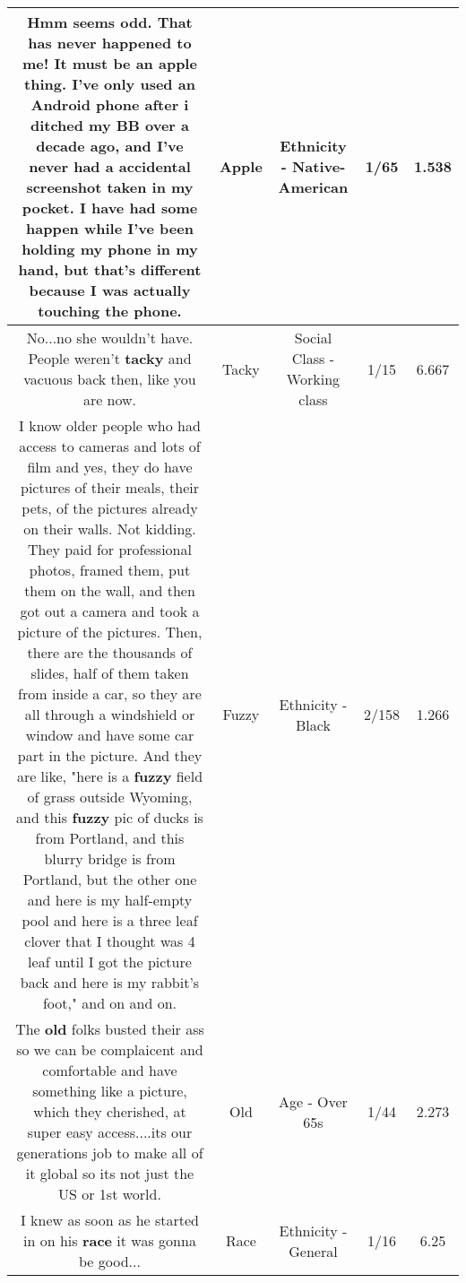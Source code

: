 \documentclass[11pt]{article}
\newlength\mylength
\begin{document}
\begin{center}
\begin{longtable}{|C{.65\mylength}|C{.30\mylength}|C{.12\mylength}|C{.12\mylength}|C{.12\mylength}|}
  \small Hmm seems odd. That has never happened to me! It must be an \textbf{apple} thing. I've only used an Android phone after i ditched my BB over a decade ago, and I've never had a accidental screenshot taken in my pocket. I have had some happen while I've been holding my phone in my hand, but that's different because I was actually touching the phone.\normalsize   & Apple & Ethnicity - Native-American & 1/65 & 1.538 \\  \hline
  \small No...no she wouldn't have. People weren't \textbf{tacky} and vacuous back then, like you are now.\normalsize   & Tacky & Social Class - Working class & 1/15 & 6.667 \\  \hline
  \small I know older people who had access to cameras and lots of  film and yes, they do have pictures of their  meals,   their pets, of the pictures already on their walls. Not kidding. They paid for professional photos, framed them, put them on the wall, and then got out a camera and took a picture of the pictures. Then, there are the thousands of slides, half of them taken from inside a car, so they are all through a windshield or window and have some car part in the picture. And they are like, "here is a \textbf{fuzzy} field of grass outside Wyoming, and this \textbf{fuzzy} pic of ducks is from Portland, and this blurry bridge is from  Portland, but the other one and here is my half-empty pool and here is a three leaf clover that I thought was 4 leaf until I got the picture back and here is my  rabbit's foot," and on and on.\normalsize   & Fuzzy & Ethnicity - Black & 2/158 & 1.266 \\  \hline
  \small The \textbf{old} folks busted their ass so we can be complaicent and comfortable and have something like a picture, which they cherished, at super easy access....its our generations job to make all of it global so its not just the US or 1st world.\normalsize   & Old & Age - Over 65s & 1/44 & 2.273 \\  \hline
  \small I knew as soon as he started in on his \textbf{race} it was gonna be good...\normalsize   & Race & Ethnicity - General & 1/16 & 6.25 \\  \hline

\end{longtable}
\end{center}
\end{document}
